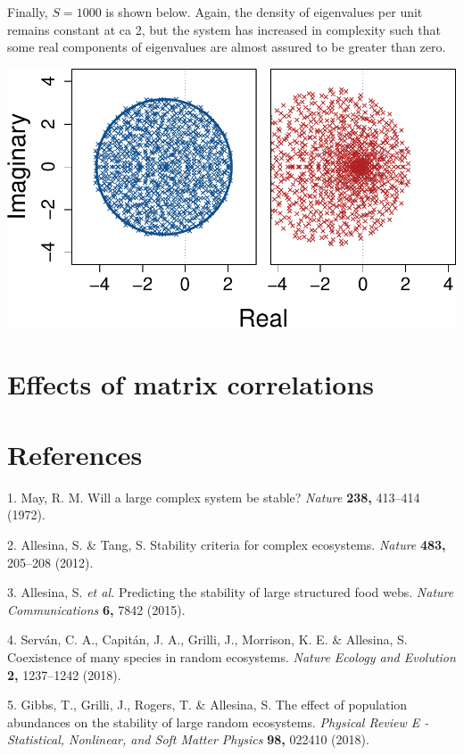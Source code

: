 \documentclass[]{article}
\begin{document}
Finally, \(S = 1000\) is shown below. Again, the density of eigenvalues
per unit remains constant at ca 2, but the system has increased in
complexity such that some real components of eigenvalues are almost
assured to be greater than zero.

\includegraphics{SI_files/figure-latex/unnamed-chunk-38-1.pdf}

\hypertarget{effects-of-matrix-correlations}{%
\section{Effects of matrix
correlations}\label{effects-of-matrix-correlations}}

\hypertarget{references}{%
\section*{References}\label{references}}

\hypertarget{refs}{}
\leavevmode\hypertarget{ref-May1972}{}%
1. May, R. M. Will a large complex system be stable? \emph{Nature}
\textbf{238,} 413--414 (1972).

\leavevmode\hypertarget{ref-Allesina2012}{}%
2. Allesina, S. \& Tang, S. Stability criteria for complex ecosystems.
\emph{Nature} \textbf{483,} 205--208 (2012).

\leavevmode\hypertarget{ref-Allesina2015}{}%
3. Allesina, S. \emph{et al.} Predicting the stability of large
structured food webs. \emph{Nature Communications} \textbf{6,} 7842
(2015).

\leavevmode\hypertarget{ref-Servan2018}{}%
4. Serván, C. A., Capitán, J. A., Grilli, J., Morrison, K. E. \&
Allesina, S. Coexistence of many species in random ecosystems.
\emph{Nature Ecology and Evolution} \textbf{2,} 1237--1242 (2018).

\leavevmode\hypertarget{ref-Gibbs2017}{}%
5. Gibbs, T., Grilli, J., Rogers, T. \& Allesina, S. The effect of
population abundances on the stability of large random ecosystems.
\emph{Physical Review E - Statistical, Nonlinear, and Soft Matter
Physics} \textbf{98,} 022410 (2018).
\end{document}
